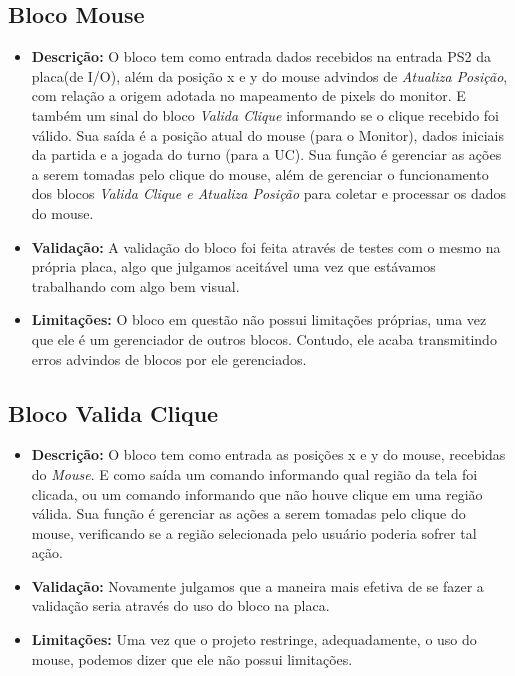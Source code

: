 \subsection{Bloco Mouse}
    \begin{itemize}
        \item \textbf{Descrição:} O bloco tem como entrada dados recebidos na entrada PS2 da placa(de I/O), além da posição x e y do mouse advindos de \emph{Atualiza Posição}, com relação a origem adotada no mapeamento de pixels do monitor. E também um sinal do bloco \emph{Valida Clique} informando se o clique recebido foi válido. Sua saída é a posição atual do mouse (para o Monitor), dados iniciais da partida e a jogada do turno (para a UC). Sua função é gerenciar as ações a serem tomadas pelo clique do mouse, além de gerenciar o funcionamento dos blocos \emph{Valida Clique e Atualiza Posição} para coletar e processar os dados do mouse.
        \item \textbf{Validação:} A validação do bloco foi feita através de testes com o mesmo na própria placa, algo que julgamos aceitável uma vez que estávamos trabalhando com algo bem visual.
        \item \textbf{Limitações:} O bloco em questão não possui limitações próprias, uma vez que ele é um gerenciador de outros blocos. Contudo, ele acaba transmitindo erros advindos de blocos por ele gerenciados.
    \end{itemize}

\subsection{Bloco Valida Clique}
    \begin{itemize}
        \item \textbf{Descrição:} O bloco tem como entrada as posições x e y do mouse, recebidas do \emph{Mouse}. E como saída um comando informando qual região da tela foi clicada, ou um comando informando que não houve clique em uma região válida. Sua função é gerenciar as ações a serem tomadas pelo clique do mouse, verificando se a região selecionada pelo usuário poderia sofrer tal ação.
        \item \textbf{Validação:} Novamente julgamos que a maneira mais efetiva de se fazer a validação seria através do uso do bloco na placa.
        \item \textbf{Limitações:} Uma vez que o projeto restringe, adequadamente, o uso do mouse, podemos dizer que ele não possui limitações.
    \end{itemize}

